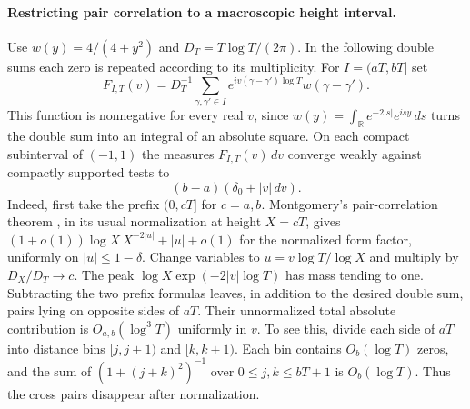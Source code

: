 \documentclass[11pt]{article}
\begin{document}
\paragraph{Restricting pair correlation to a macroscopic height interval.}
Use $w(y)=4/(4+y^2)$ and $D_T=T\log T/(2\pi)$. In the following double sums each zero is repeated according to its multiplicity. For $I=(aT,bT]$ set
\[
  F_{I,T}(v)=D_T^{-1}\sum_{\gamma,\gamma'\in I}
            e^{iv(\gamma-\gamma')\log T}w(\gamma-\gamma').
\]
This function is nonnegative for every real $v$, since $w(y)=\int_{\mathbb R}e^{-2|s|}e^{isy}\,ds$ turns the double sum into an integral of an absolute square. On each compact subinterval of $(-1,1)$ the measures $F_{I,T}(v)\,dv$ converge weakly against compactly supported tests to
\[
 (b-a)(\delta_0+|v|\,dv).
\]
Indeed, first take the prefix $(0,cT]$ for $c=a,b$. Montgomery's pair-correlation theorem \cite{mont}, in its usual normalization at height $X=cT$, gives
$(1+o(1))\log X\,X^{-2|u|}+|u|+o(1)$ for the normalized form factor, uniformly on $|u|\le1-\delta$. Change variables to $u=v\log T/\log X$ and multiply by $D_X/D_T\to c$. The peak $\log X\exp(-2|v|\log T)$ has mass tending to one. Subtracting the two prefix formulas leaves, in addition to the desired double sum, pairs lying on opposite sides of $aT$. Their unnormalized total absolute contribution is $O_{a,b}(\log^3 T)$ uniformly in $v$. To see this, divide each side of $aT$ into distance bins $[j,j+1)$ and $[k,k+1)$. Each bin contains $O_b(\log T)$ zeros, and the sum of $(1+(j+k)^2)^{-1}$ over $0\le j,k\le bT+1$ is $O_b(\log T)$. Thus the cross pairs disappear after normalization.
\end{document}
